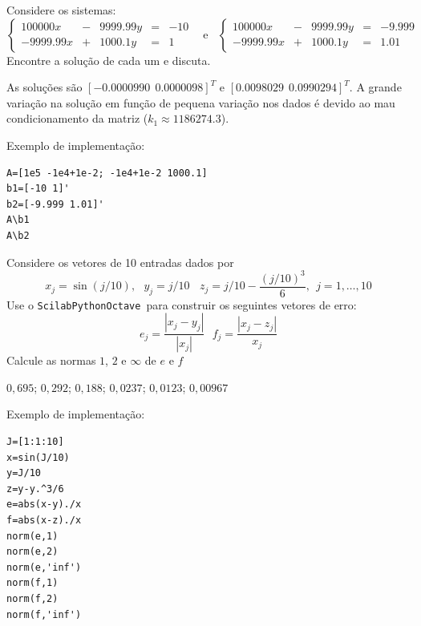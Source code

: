 \begin{exer} Considere os sistemas:
\begin{equation}
\left\{
\begin{array}{rclcl}
100000 x  &-& 9999.99 y  &=&-10\\
-9999.99 x &+&  1000.1 y &=&1
\end{array}\right. ~~~~\text{e}~~~~
\left\{
\begin{array}{rclcl}
100000 x  &-& 9999.99 y  &=&-9.999\\
-9999.99 x &+&  1000.1 y &=&1.01
\end{array}\right.
\end{equation}
Encontre a solução de cada um e discuta.
\end{exer}
\begin{resp}

As soluções são $[-0.0000990 ~~ 0.0000098]^T$ e $[0.0098029 ~~ 0.0990294]^T$. A grande variação na solução em função de pequena variação nos dados é devido ao mau condicionamento da matriz ($k_1\approx 1186274.3 $).

Exemplo de implementação:
\begin{verbatim}
A=[1e5 -1e4+1e-2; -1e4+1e-2 1000.1]
b1=[-10 1]'
b2=[-9.999 1.01]'
A\b1
A\b2
\end{verbatim}

\end{resp}

\begin{exer} Considere os vetores de 10 entradas dados por \begin{equation} x_j=\sin(j/10),~~~y_j=j/10~~~~z_j=j/10-\frac{\left(j/10\right)^3}{6},~~ j=1,\ldots,10 \end{equation}
Use o \ifisscilab\verb+Scilab+\fi\ifispython\verb+Python+\fi\ifisoctave\verb+Octave+\fi~para construir os seguintes vetores de erro:
\begin{equation} e_{j}=\frac{|x_j-y_j|}{|x_j|}~~~ f_j=\frac{|x_j-z_j|}{x_j} \end{equation}
Calcule as normas $1$, $2$ e $\infty$ de $e$ e $f$
\end{exer}
\begin{resp}
$0,695$; $0,292$; $0,188$;  $0,0237$; $0,0123$; $0,00967$

\ifisscilab
Exemplo de implementação:
\begin{verbatim}
J=[1:1:10]
x=sin(J/10)
y=J/10
z=y-y.^3/6
e=abs(x-y)./x
f=abs(x-z)./x
norm(e,1)
norm(e,2)
norm(e,'inf')
norm(f,1)
norm(f,2)
norm(f,'inf')
\end{verbatim}
\fi
\end{resp}



